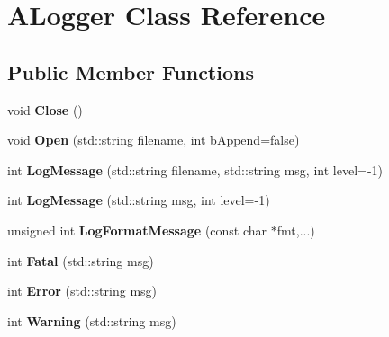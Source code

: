 \hypertarget{class_a_logger}{}\section{A\+Logger Class Reference}
\label{class_a_logger}
\subsection*{Public Member Functions}
\begin{DoxyCompactItemize}
\item 
\hypertarget{class_a_logger_a21af98bd1c9fdbde4098d2b242cb9ea9}{}void {\bfseries Close} ()\label{class_a_logger_a21af98bd1c9fdbde4098d2b242cb9ea9}

\item 
\hypertarget{class_a_logger_aecec26cddee0a644ae8ac096b2c016ca}{}void {\bfseries Open} (std\+::string filename, int b\+Append=false)\label{class_a_logger_aecec26cddee0a644ae8ac096b2c016ca}

\item 
\hypertarget{class_a_logger_a55589cb378e3623a35c6057613b818a3}{}int {\bfseries Log\+Message} (std\+::string filename, std\+::string msg, int level=-\/1)\label{class_a_logger_a55589cb378e3623a35c6057613b818a3}

\item 
\hypertarget{class_a_logger_a791e035a97c7d5f4ea809288290d43ec}{}int {\bfseries Log\+Message} (std\+::string msg, int level=-\/1)\label{class_a_logger_a791e035a97c7d5f4ea809288290d43ec}

\item 
\hypertarget{class_a_logger_a551f07b441d91d7f4cad8b9b87fa66ed}{}unsigned int {\bfseries Log\+Format\+Message} (const char $\ast$fmt,...)\label{class_a_logger_a551f07b441d91d7f4cad8b9b87fa66ed}

\item 
\hypertarget{class_a_logger_a040e23b0907c20b1bc33ad438eeae387}{}int {\bfseries Fatal} (std\+::string msg)\label{class_a_logger_a040e23b0907c20b1bc33ad438eeae387}

\item 
\hypertarget{class_a_logger_a6a5eae7afd2d2ecb285094695ef7412e}{}int {\bfseries Error} (std\+::string msg)\label{class_a_logger_a6a5eae7afd2d2ecb285094695ef7412e}

\item 
\hypertarget{class_a_logger_a222284c08bb2192d0ec9d1746fe248dc}{}int {\bfseries Warning} (std\+::string msg)\label{class_a_logger_a222284c08bb2192d0ec9d1746fe248dc}


\end{DoxyCompactItemize}
